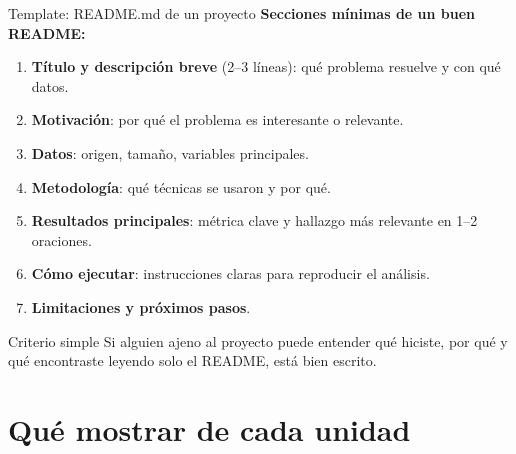 \documentclass[aspectratio=169]{beamer}
\begin{document}
\begin{frame}{Template: README.md de un proyecto}
  \textbf{Secciones mínimas de un buen README:}

  \bigskip
  \begin{enumerate}
    \item \textbf{Título y descripción breve} (2--3 líneas): qué problema resuelve y con qué datos.
    \item \textbf{Motivación}: por qué el problema es interesante o relevante.
    \item \textbf{Datos}: origen, tamaño, variables principales.
    \item \textbf{Metodología}: qué técnicas se usaron y por qué.
    \item \textbf{Resultados principales}: métrica clave y hallazgo más relevante en 1--2 oraciones.
    \item \textbf{Cómo ejecutar}: instrucciones claras para reproducir el análisis.
    \item \textbf{Limitaciones y próximos pasos}.
  \end{enumerate}

  \bigskip
  \begin{exampleblock}{Criterio simple}
    Si alguien ajeno al proyecto puede entender qué hiciste, por qué y qué encontraste leyendo solo el README, está bien escrito.
  \end{exampleblock}
\end{frame}

\section{Qué mostrar de cada unidad}
\end{document}
